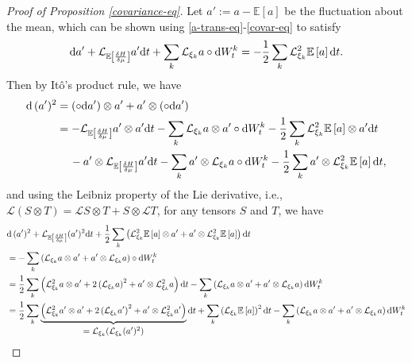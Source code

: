 \documentclass[11pt, oneside]{article}   	%
\numberwithin{equation}{section}
\theoremstyle{plain}
\theoremstyle{definition}
\theoremstyle{remark}
\newcommand{\<}{\langle}
\renewcommand{\>}{\rangle}
\def\diff{\textnormal{d}}
\newcommand{\E}[1]{\mathbb{E}\left[{#1}\right]}
\begin{document}
\begin{proof}[Proof of Proposition \ref{covariance-eq}]
Let $a' := a - \E{a}$ be the fluctuation about the mean, which can be shown using \eqref{a-trans-eq}-\eqref{covar-eq} to satisfy
\begin{align} \label{a-fluctuation-eq}
    \diff a' + \mathcal L_{\E{\frac{\delta H}{\delta \mu}}} a' \diff t + \displaystyle\sum_k \mathcal L_{\xi_k} a \circ \diff W_t^k = -\frac12 \displaystyle\sum_k \mathcal{L}_{\xi_k}^2 \E{a} \diff t.
\end{align}
Then by It\^o's product rule, we have
\begin{align*}
    \diff \, (a')^2 &= (\circ \diff a') \otimes a' + a' \otimes (\circ \diff a') \\
    &= -\mathcal L_{\E{\frac{\delta H}{\delta \mu}}} a' \otimes a' \diff t - \displaystyle\sum_k \mathcal L_{\xi_k} a \otimes a' \circ \diff W_t^k - \frac12 \displaystyle\sum_k \mathcal L_{\xi_k}^2 \E{a} \otimes a' \diff t \\
    &\quad\, - a' \otimes \mathcal L_{\E{\frac{\delta H}{\delta \mu}}} a'  \diff t - \displaystyle\sum_k  a' \otimes \mathcal L_{\xi_k} a \circ \diff W_t^k - \frac12 \displaystyle\sum_k a' \otimes \mathcal L_{\xi_k}^2 \E{a} \diff t,
\end{align*}
and using the Leibniz property of the Lie derivative, i.e., $\mathcal{L}(S \otimes T) = \mathcal{L} S \otimes T + S \otimes \mathcal{L} T$, for any tensors $S$ and $T$, we have
\begin{align}
    &\diff \,(a')^2 + \mathcal L_{\E{\frac{\delta H}{\delta \mu}}} (a')^2 \diff t + \frac12 \displaystyle\sum_k \left(\mathcal L_{\xi_k}^2 \E{a} \otimes a' + a' \otimes \mathcal L_{\xi_k}^2 \E{a}\right) \diff t \nonumber\\
    &= -\displaystyle\sum_k \left(\mathcal L_{\xi_k} a \otimes a' + a' \otimes \mathcal L_{\xi_k} a\right) \circ \diff W_t^k \nonumber\\
    &= \frac12 \displaystyle\sum_k \left(\mathcal L_{\xi_k}^2 a \otimes a' + 2\left(\mathcal L_{\xi_k} a\right)^2 + a' \otimes \mathcal L_{\xi_k}^2 a\right) \diff t - \displaystyle\sum_k \left(\mathcal L_{\xi_k} a \otimes a' + a' \otimes \mathcal L_{\xi_k} a\right) \diff W_t^k \nonumber\\
    &= \frac12 \displaystyle\sum_k \underbrace{\left(\mathcal L_{\xi_k}^2 a' \otimes a' + 2\left(\mathcal L_{\xi_k} a'\right)^2 + a' \otimes \mathcal L_{\xi_k}^2 a'\right)}_{\hbox{$= \mathcal{L}_{\xi_k}(\mathcal L_{\xi_k} (a')^2)$}} \diff t  + \sum_k\left(\mathcal L_{\xi_k} \E{a}\right)^2 \diff t -\displaystyle\sum_k \left(\mathcal L_{\xi_k} a \otimes a' + a' \otimes \mathcal L_{\xi_k} a\right) \diff W_t^k \nonumber\\

\end{align}
\end{proof}
\end{document}
